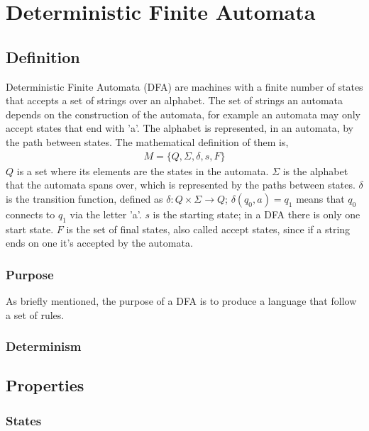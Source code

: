 \documentclass[12pt]{article}
\begin{document}
	\section{Deterministic Finite Automata}
	\subsection{Definition}
	Deterministic Finite Automata (DFA) are machines with a finite number of states that accepts a set of strings over an alphabet. \newline
	The set of strings an automata depends on the construction of the automata, for example an automata may only accept states that end with 'a'. \newline
	The alphabet is represented, in an automata, by the path between states. \newline
	The mathematical definition of them is,
	\begin{eqnarray}
		M = \{Q, \Sigma, \delta, s, F \}
	\end{eqnarray}
	$ Q $ is a set where its elements are the states in the automata. \newline
	$\Sigma$ is the alphabet that the automata spans over, which is represented by the paths between states. \newline
	$\delta$ is the transition function, defined as $\delta: Q \times \Sigma \rightarrow Q $; $\delta(q_0, a) = q_1$ means that $q_0$ connects to $q_1$ via the letter 'a'. \newline
	$s$ is the starting state; in a DFA there is only one start state. \newline
	$F$ is the set of final states, also called accept states, since if a string ends on one it's accepted by the automata. \newline
	\subsubsection{Purpose}
	As briefly mentioned, the purpose of a DFA is to produce a language that follow a set of rules. \newline
	\subsubsection{Determinism}
	\subsection{Properties}
	\subsubsection{States}
\end{document}
